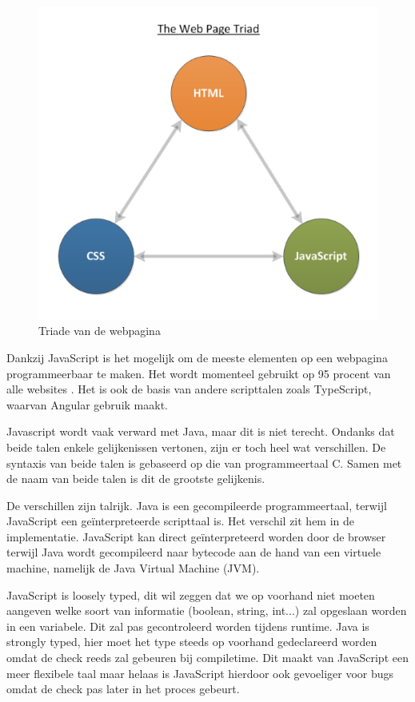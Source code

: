 \begin{figure}[H]
	\centering
	\includegraphics[width=0.6\linewidth]{triadJavaScript}
	\caption{Triade van de webpagina \autocite{itegrators2017}}
	\label{fig:Triade}
\end{figure}

Dankzij JavaScript is het mogelijk om de meeste elementen op een webpagina programmeerbaar te maken. Het wordt momenteel gebruikt op 95 procent van alle websites \autocite{W3Techs2019}. Het is ook de basis van andere scripttalen zoals TypeScript, waarvan Angular gebruik maakt.

Javascript wordt vaak verward met Java, maar dit is niet terecht. Ondanks dat beide talen enkele gelijkenissen vertonen, zijn er toch heel wat verschillen. De syntaxis van beide talen is gebaseerd op die van programmeertaal C. Samen met de naam van beide talen is dit de grootste gelijkenis. 

De verschillen zijn talrijk.
 Java is een gecompileerde programmeertaal, terwijl JavaScript een geïnterpreteerde scripttaal is. Het verschil zit hem in de implementatie.  JavaScript kan direct geïnterpreteerd worden door de browser terwijl Java wordt gecompileerd naar bytecode aan de hand van een virtuele machine, namelijk de Java Virtual Machine (JVM). 

 JavaScript is loosely typed, dit wil zeggen dat we op voorhand niet moeten aangeven welke soort van informatie (boolean, string, int...) zal opgeslaan worden in een variabele. Dit zal pas gecontroleerd worden tijdens runtime. Java is strongly typed, hier moet het type steeds op voorhand gedeclareerd worden omdat de check reeds zal gebeuren bij compiletime. Dit maakt van JavaScript een meer flexibele taal maar helaas is JavaScript hierdoor ook gevoeliger voor bugs omdat de check pas later in het proces gebeurt.
 
